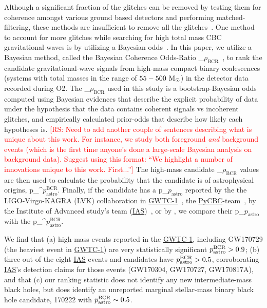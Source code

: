 \documentclass[%
 nofootinbib,
 amsmath,amssymb,
 aps,
 twocolumn,
 superscriptaddress
]{revtex4-2}
\newcommand{\pycbc}{{\sc \href{https://pycbc.org/}{{PyCBC}}}\xspace}
\newcommand{\GWTC}{{\sc \href{https://ui.adsabs.harvard.edu/abs/2019PhRvX...9c1040A/abstract}{{GWTC-1}}}\xspace}
\newcommand{\IAS}{{\sc \href{https://ui.adsabs.harvard.edu/abs/2020PhRvD.101h3030V/abstract}{{IAS}}}\xspace}
\newcommand{\fancytext}[1]{{\relax\ifmmode#1\else $#1$\fi}\xspace}
\newcommand{\mathcmd}[1]{{\sc \relax\ifmmode#1\else $#1$\fi}\xspace}
\newcommand{\bcr}{\mathcmd{\rho_\text{BCR}}}
\newcommand{\msun}{\mathcmd{\text{M}_\odot}}
\newcommand{\pastro}{\fancytext{p_\text{astro}}}
\newcommand{\pastrobcr}{\fancytext{p_\text{astro}^{\text{BCR}}}}
\newcommand{\rs}[1]{\textcolor{red}{[RS: #1]}}
\begin{document}
Although a significant fraction of the glitches can be removed by testing them for coherence amongst various ground based detectors and performing matched-filtering, these methods are insufficient to remove all the glitches~\cite{ pycbc_short_duration_transients, pe_with_glitch, blip_glitches}. One method to account for more glitches while searching for high total mass CBC gravitational-waves is by utilizing a Bayesian odds~\cite{bci, kanner2016leveraging, BCR1, BCR2, bcr_gw151216, bayesian_odds}. In this paper, we utilize a Bayesian method, called the Bayesian Coherence Odds-Ratio \bcr~\cite{BCR1}, to rank the candidate gravitational-wave signals from high-mass compact binary coalescences (systems with total masses in the range of $55-500\ \msun$) in the detector data recorded during O2. The \bcr used in this study is a bootstrap-Bayesian odds computed using Bayesian evidences that describe the explicit probability of data under the hypothesis that the data contains coherent signals vs incoherent glitches, and empirically calculated prior-odds that describe how likely each hypotheses is. \rs{Need to add another couple of sentences describing what is unique about this work. For instance, we study both foreground \textit{and} background events (which is the first time anyone's done a large-scale Bayesian analysis on background data). Suggest using this format: ``We highlight a number of innovations unique to this work. First...''} The high-mass candidate \bcr values are then used to calculate the probability that the candidate is of astrophysical origins, \pastrobcr. Finally, if the candidate has a \pastro reported by the the LIGO-Virgo-KAGRA (LVK) collaboration in \GWTC~\cite{GWTC1}, the \pycbc-team~\cite{pycbc_code, pycbc_og0, pycbc_og1, pycbc_og2, pycbc_og3, pycbc_og4, pycbc_og5, pycbc_og6, pycbc_single_det, pycbc_ogc_2}, by the Institute of Advanced study's team (\IAS)~\cite{IAS0, IAS1, IAS2}, or by \citet{bayesian_odds}, we compare their \pastro with the \pastrobcr.


We find that (a) high-mass events reported in the \GWTC, including GW170729 (the heaviest event in \GWTC) are very statistically significant $\pastrobcr>0.9$; (b) three out of the eight \IAS events and candidates have $\pastrobcr>0.5$, corroborating \IAS's detection claims for those events (GW170304, GW170727, GW170817A), and that (c) our ranking statistic does not identify any new intermediate-mass black holes, but does identify an unreported marginal stellar-mass binary black hole candidate, 170222 with $\pastrobcr\sim0.5$.
\end{document}
